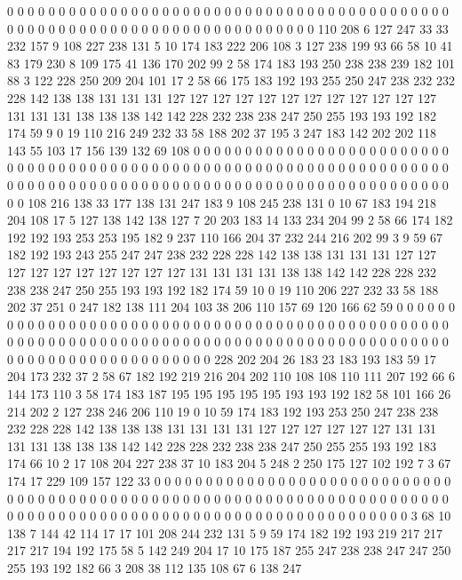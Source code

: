 0 0 0 0 0 0 0 0 0 0 0 0 0 0 0 0 0 0 0 0
0 0 0 0 0 0 0 0 0 0 0 0 0 0 0 0 0 0 0 0
0 0 0 0 0 0 0 0 0 0 0 0 0 0 0 0 0 0 0 0
0 0 0 0 0 0 0 0 0 0 0 0 0 110 208 6 127 247 33 33
232 157 9 108 227 238 131 5 10 174 183 222 206 108 3 127 238 199 93 66
58 10 41 83 179 230 8 109 175 41 136 170 202 99 2 58 174 183 193 250
238 238 239 182 101 88 3 122 228 250 209 204 101 17 2 58 66 175 183 192
193 255 250 247 238 232 232 228 142 138 138 131 131 131 127 127 127 127 127 127
127 127 127 127 127 127 131 131 131 138 138 138 142 142 228 232 238 238 247 250
255 193 193 192 182 174 59 9 0 19 110 216 249 232 33 58 188 202 37 195
3 247 183 142 202 202 118 143 55 103 17 156 139 132 69 108 0 0 0 0
0 0 0 0 0 0 0 0 0 0 0 0 0 0 0 0 0 0 0 0
0 0 0 0 0 0 0 0 0 0 0 0 0 0 0 0 0 0 0 0
0 0 0 0 0 0 0 0 0 0 0 0 0 0 0 0 0 0 0 0
0 0 0 0 0 0 0 0 0 0 0 0 0 0 0 0 0 0 0 0
0 0 0 0 0 0 0 0 0 0 0 0 0 0 0 0 0 0 0 0
0 0 0 0 0 0 0 0 0 108 216 138 33 177 138 131 247 183 9 108
245 238 131 0 10 67 183 194 218 204 108 17 5 127 138 142 138 127 7 20
203 183 14 133 234 204 99 2 58 66 174 182 192 192 193 253 253 195 182 9
237 110 166 204 37 232 244 216 202 99 3 9 59 67 182 192 193 243 255 247
247 238 232 228 228 142 138 138 131 131 131 127 127 127 127 127 127 127 127 127
127 131 131 131 131 138 138 142 142 228 228 232 238 238 247 250 255 193 193 192
182 174 59 10 0 19 110 206 227 232 33 58 188 202 37 251 0 247 182 138
111 204 103 38 206 110 157 69 120 166 62 59 0 0 0 0 0 0 0 0
0 0 0 0 0 0 0 0 0 0 0 0 0 0 0 0 0 0 0 0
0 0 0 0 0 0 0 0 0 0 0 0 0 0 0 0 0 0 0 0
0 0 0 0 0 0 0 0 0 0 0 0 0 0 0 0 0 0 0 0
0 0 0 0 0 0 0 0 0 0 0 0 0 0 0 0 0 0 0 0
0 0 0 0 0 0 0 0 0 0 0 0 0 0 0 0 0 0 0 0
0 0 0 0 228 202 204 26 183 23 183 193 183 59 17 204 173 232 37 2
58 67 182 192 219 216 204 202 110 108 108 110 111 207 192 66 6 144 173 110
3 58 174 183 187 195 195 195 195 195 193 193 192 182 58 101 166 26 214 202
2 127 238 246 206 110 19 0 10 59 174 183 192 193 253 250 247 238 238 232
228 228 142 138 138 138 131 131 131 131 127 127 127 127 127 127 131 131 131 131
138 138 138 142 142 228 228 232 238 238 247 250 255 255 193 192 183 174 66 10
2 17 108 204 227 238 37 10 183 204 5 248 2 250 175 127 102 192 7 3
67 174 17 229 109 157 122 33 0 0 0 0 0 0 0 0 0 0 0 0
0 0 0 0 0 0 0 0 0 0 0 0 0 0 0 0 0 0 0 0
0 0 0 0 0 0 0 0 0 0 0 0 0 0 0 0 0 0 0 0
0 0 0 0 0 0 0 0 0 0 0 0 0 0 0 0 0 0 0 0
0 0 0 0 0 0 0 0 0 0 0 0 0 0 0 0 0 0 0 0
0 0 0 0 0 0 0 0 0 0 0 0 0 0 0 0 0 0 0 3
68 10 138 7 144 42 114 17 17 101 208 244 232 131 5 9 59 174 182 192
193 219 217 217 217 217 194 192 175 58 5 142 249 204 17 10 175 187 255 247
238 238 247 247 250 255 193 192 182 66 3 208 38 112 135 108 67 6 138 247
